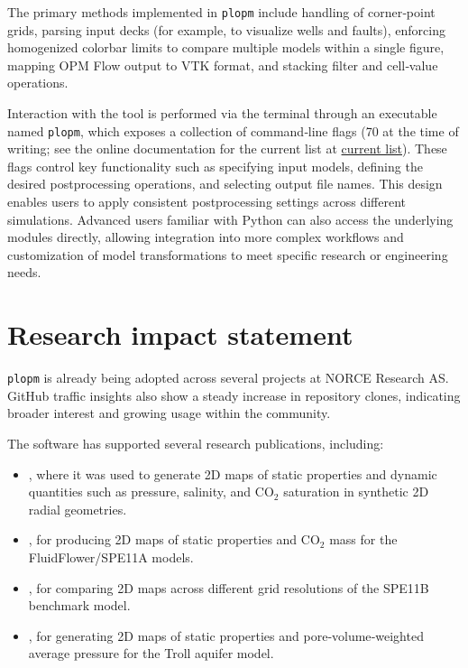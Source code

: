 \documentclass[11pt]{article}
\begin{document}
The primary methods implemented in \texttt{plopm} include handling of corner‑point grids, parsing input decks (for example, to visualize wells and faults), enforcing homogenized colorbar limits to compare multiple models within a single figure, mapping OPM Flow output to VTK format, and stacking filter and cell‑value operations.

Interaction with the tool is performed via the terminal through an executable named \texttt{plopm}, which exposes a collection of command‑line flags (70 at the time of writing; see the online documentation for the current list at \href{https://cssr-tools.github.io/plopm/introduction.html#overview}{current list}). These flags control key functionality such as specifying input models, defining the desired postprocessing operations, and selecting output file names. This design enables users to apply consistent postprocessing settings across different simulations. Advanced users familiar with Python can also access the underlying modules directly, allowing integration into more complex workflows and customization of model transformations to meet specific research or engineering needs.

\section{Research impact statement}
\texttt{plopm} is already being adopted across several projects at NORCE Research AS. GitHub traffic insights also show a steady increase in repository clones, indicating broader interest and growing usage within the community.

The software has supported several research publications, including:
\begin{itemize}
  \item \cite{10.2118/218477-MS}, where it was used to generate 2D maps of static properties and dynamic quantities such as pressure, salinity, and CO$_2$ saturation in synthetic 2D radial geometries.
  \item \cite{10.1007/s11242-025-02275-0}, for producing 2D maps of static properties and CO$_2$ mass for the FluidFlower/SPE11A models.
  \item \cite{10.2118/231853-PA}, for comparing 2D maps across different grid resolutions of the SPE11B benchmark model.
  \item \cite{landamarban2025}, for generating 2D maps of static properties and pore‑volume‑weighted average pressure for the Troll aquifer model.
\end{itemize}
\end{document}
